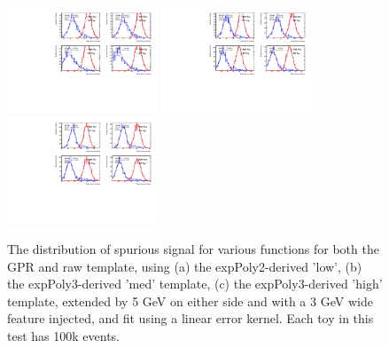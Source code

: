 \begin{figure} 
\begin{center}
  \includegraphics[width=0.4\textwidth]{figures/background/gpr/validation/linear/ToyTest_FitSigVals_lowpT_100k_Sig_1s}   
  \includegraphics[width=0.4\textwidth]{figures/background/gpr/validation/linear/ToyTest_FitSigVals_medpT_100k_Sig_1s}   
  \includegraphics[width=0.4\textwidth]{figures/background/gpr/validation/linear/ToyTest_FitSigVals_highpT_100k_Sig_1s}   
\caption{The distribution of spurious signal for various functions for both the GPR and raw template, using (a) the expPoly2-derived 'low', (b) the expPoly3-derived 'med' template, (c) the expPoly3-derived 'high' template, extended by 5 GeV on either side and with a 3 GeV wide feature injected, and fit using a linear error kernel. Each toy in this test has 100k events.}
\label{fig:linearkernel_lowpt_100k_Sig_1s}
\end{center}
\end{figure}

